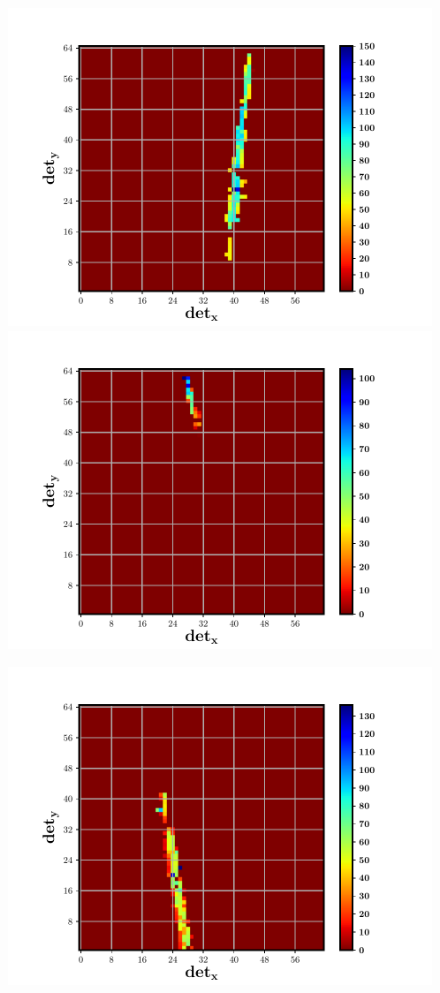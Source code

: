 \begin{figure}
\begin{center}
\includegraphics[scale=0.42]{Q1--merged_35+36}
\includegraphics[scale=0.42]{Q1--merged_11114+11115}
\end{center}
\begin{center}
\includegraphics[scale=0.42]{Q1--merged_2853+2854}

\end{center}
\end{figure}
